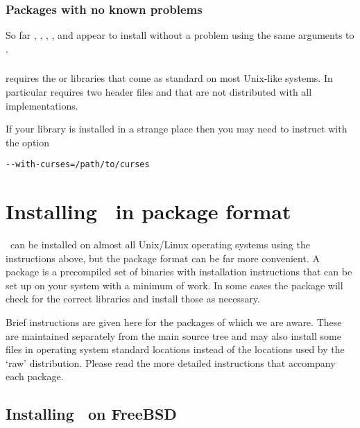 \documentclass{report}
\begin{document}
\subsubsection{Packages with no known problems}
So far , , ,
,  and  appear to
install without a problem using the same arguments to
.

\subsubsection{}

 requires the  or  libraries 
that come as standard on most Unix-like systems. In particular  
requires two header files  and  that are not 
distributed with all implementations.

If your  
library is installed in a strange place then you may need to instruct 
 with the option 

\begin{verbatim}
--with-curses=/path/to/curses
\end{verbatim}


\section{Installing \EMBOSS\ in package format}
\label{sec:FreeBSD}
\EMBOSS\ can be installed on almost all Unix/Linux operating systems
using the instructions above, but the package format can be far more
convenient.  A package is a precompiled set of binaries with
installation instructions that can be set up on your system with a
minimum of work. In some cases the package will check for the correct
libraries and install those as necessary.

Brief instructions are given here for the packages of which we are
aware. These are maintained separately from the main source tree and
may also install some files in operating system standard locations
instead of the locations used by the `raw' \EMBOSS
distribution. Please read the more detailed instructions that
accompany each package.

\subsection{Installing \EMBOSS\ on FreeBSD}
\end{document}
